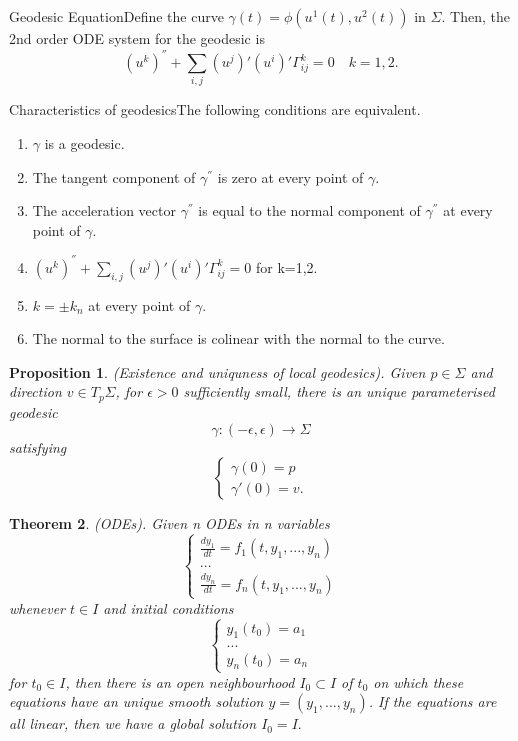 \documentclass[twoside]{article}
\newcounter{lecnum}
\newtheorem{theorem}{Theorem}[lecnum]
\newtheorem{proposition}[theorem]{Proposition}
\begin{document}
\begin{definition_exam}{Geodesic Equation}{}Define the curve $\gamma(t) = \phi(u^{1}(t), u^{2}(t))$ in $\Sigma$. Then, the 2nd order ODE system for the geodesic is 
$$
(u^k)^{''} + \sum_{i, j}(u^j)'(u^i)'\Gamma_{ij}^{k} = 0 \quad k=1,2.
$$
\end{definition_exam}


\begin{theorem_exam}{Characteristics of geodesics}{}The following conditions are equivalent.
\begin{enumerate}
\item $\gamma$ is a geodesic.
\item The tangent component of $\gamma^{''}$ is zero at every point of $\gamma.$
\item The acceleration vector $\gamma^{''}$ is equal to the normal component of $\gamma^{''}$ at every point of $\gamma.$
\item $(u^k)^{''} + \sum_{i, j}(u^j)'(u^i)'\Gamma_{ij}^{k} = 0$ for k=1,2.
\item $k = \pm k_n$ at every point of $\gamma.$
\item The normal to the surface is colinear with the normal to the curve.
\end{enumerate}
\end{theorem_exam}

\begin{proposition}(Existence and uniquness of local geodesics). Given $p \in \Sigma$ and direction $v \in T_p\Sigma$, for $\epsilon > 0$ sufficiently small, there is an unique parameterised geodesic 
$$
\gamma: (-\epsilon, \epsilon) \rightarrow \Sigma
$$
satisfying 
$$
\begin{cases}
\gamma(0) = p\\
\gamma'(0) = v.
\end{cases}
$$
\end{proposition}


\begin{theorem}(ODEs). Given n ODEs in n variables 
$$
\begin{cases}
 \frac{dy_1}{dt} = f_1(t,y_1,...,y_n)\\
...\\
\frac{dy_n}{dt} = f_n(t,y_1,...,y_n)
\end{cases}
$$
whenever $t \in I$ and initial conditions 
$$
\begin{cases}
y_1(t_0) = a_1\\
...\\
y_n(t_0) = a_n
\end{cases}
$$
for $t_0 \in I$, then there is an open neighbourhood $I_0 \subset I$ of $t_0$ on which these equations have an unique smooth solution $y=(y_1,...,y_n)$. If the equations are all linear, then we have a global solution $I_0 = I.$
\end{theorem}
\end{document}

